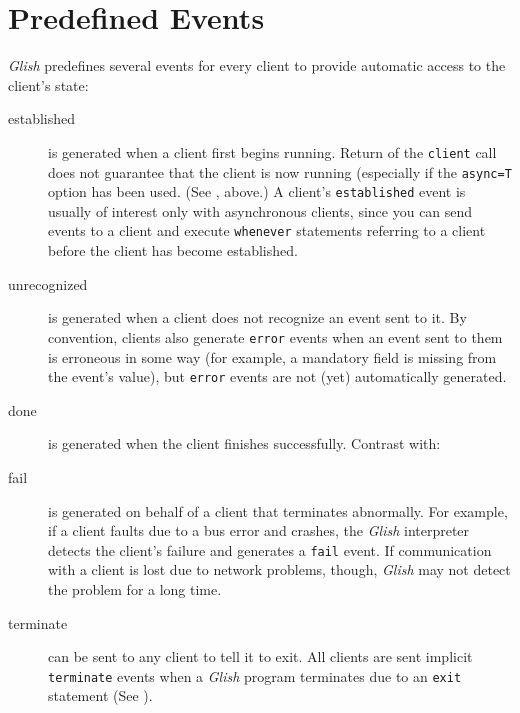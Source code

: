 \section{Predefined Events}
\label{predefined-events}

{\em Glish} predefines several events for every client to provide automatic
access to the client's state:

\begin{sloppy}
\begin{description}

\item[established] is
generated when a client first begins running.  Return of the {\tt client}
call does not guarantee that the client is now running (especially if
the {\tt async=T} option has been used. (See , 
above.)
A client's {\tt established} event is usually of interest only with
asynchronous clients, since you can send events to a client and execute
{\tt whenever} statements referring to a client before the client has
become established.

\item[unrecognized] is
generated when a client does not recognize an event sent to it.  By
convention, clients also generate {\tt error} events when an event sent
to them is erroneous in some way (for example, a mandatory field is
missing from the event's value), but {\tt error} events are not (yet)
automatically generated.

\item[done] is
generated when the client finishes successfully.  Contrast with:

\item[fail] is
generated on behalf of a client that terminates abnormally.
For example, if a client faults due to a bus error and crashes, the 
{\em Glish} interpreter detects the client's 
failure and generates a {\tt fail}
event.  If communication with a client is lost due to network problems,
though, {\em Glish} may not detect the problem for a long time.

\item[terminate]
can be sent to any client to tell it to exit.  All
clients are sent implicit {\tt terminate} events when a {\em Glish} program
terminates due to an {\tt exit} statement (See ).

\end{description}
\end{sloppy}

